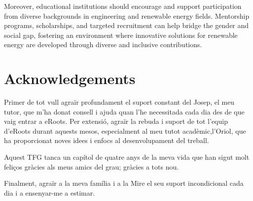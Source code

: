 \documentclass[a4paper,11pt, titlepage, twoside]{article}
\begin{document}
Moreover, educational institutions should encourage and support participation from diverse backgrounds in engineering and renewable energy fields. Mentorship programs, scholarships, and targeted recruitment can help bridge the gender and social gap, fostering an environment where innovative solutions for renewable energy are developed through diverse and inclusive contributions.


\section*{Acknowledgements}

Primer de tot vull agraïr profundament el suport constant del Josep, el meu tutor, que m'ha donat consell i ajuda quan
l'he necessitada cada dia des de que vaig entrar a eRoots. Per extensió, agraïr la rebuda i suport de tot l'equip d'eRoots durant aquests mesos,
especialment al meu tutot acadèmic,l'Oriol, que ha proporcionat noves idees i enfocs al desenvolupament del treball.\par

Aquest TFG tanca un capítol de quatre anys de la meva vida que han sigut molt feliços gràcies als meus amics del grau; gràcies a tots nou.\par 
Finalment, agraïr a la meva família i a la Mire el seu suport incondicional cada dia i a ensenyar-me a estimar.
 
\end{document}
